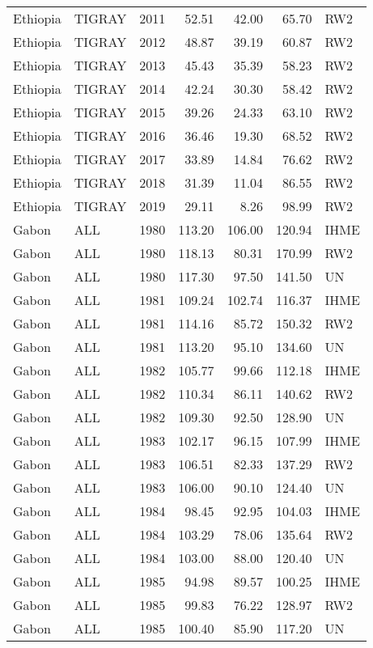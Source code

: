 \begin{longtable}{lllrrrl}
  Ethiopia & TIGRAY & 2011 & 52.51 & 42.00 & 65.70 & RW2 \\ 
  Ethiopia & TIGRAY & 2012 & 48.87 & 39.19 & 60.87 & RW2 \\ 
  Ethiopia & TIGRAY & 2013 & 45.43 & 35.39 & 58.23 & RW2 \\ 
  Ethiopia & TIGRAY & 2014 & 42.24 & 30.30 & 58.42 & RW2 \\ 
  Ethiopia & TIGRAY & 2015 & 39.26 & 24.33 & 63.10 & RW2 \\ 
  Ethiopia & TIGRAY & 2016 & 36.46 & 19.30 & 68.52 & RW2 \\ 
  Ethiopia & TIGRAY & 2017 & 33.89 & 14.84 & 76.62 & RW2 \\ 
  Ethiopia & TIGRAY & 2018 & 31.39 & 11.04 & 86.55 & RW2 \\ 
  Ethiopia & TIGRAY & 2019 & 29.11 & 8.26 & 98.99 & RW2 \\ 
  Gabon & ALL & 1980 & 113.20 & 106.00 & 120.94 & IHME \\ 
  Gabon & ALL & 1980 & 118.13 & 80.31 & 170.99 & RW2 \\ 
  Gabon & ALL & 1980 & 117.30 & 97.50 & 141.50 & UN \\ 
  Gabon & ALL & 1981 & 109.24 & 102.74 & 116.37 & IHME \\ 
  Gabon & ALL & 1981 & 114.16 & 85.72 & 150.32 & RW2 \\ 
  Gabon & ALL & 1981 & 113.20 & 95.10 & 134.60 & UN \\ 
  Gabon & ALL & 1982 & 105.77 & 99.66 & 112.18 & IHME \\ 
  Gabon & ALL & 1982 & 110.34 & 86.11 & 140.62 & RW2 \\ 
  Gabon & ALL & 1982 & 109.30 & 92.50 & 128.90 & UN \\ 
  Gabon & ALL & 1983 & 102.17 & 96.15 & 107.99 & IHME \\ 
  Gabon & ALL & 1983 & 106.51 & 82.33 & 137.29 & RW2 \\ 
  Gabon & ALL & 1983 & 106.00 & 90.10 & 124.40 & UN \\ 
  Gabon & ALL & 1984 & 98.45 & 92.95 & 104.03 & IHME \\ 
  Gabon & ALL & 1984 & 103.29 & 78.06 & 135.64 & RW2 \\ 
  Gabon & ALL & 1984 & 103.00 & 88.00 & 120.40 & UN \\ 
  Gabon & ALL & 1985 & 94.98 & 89.57 & 100.25 & IHME \\ 
  Gabon & ALL & 1985 & 99.83 & 76.22 & 128.97 & RW2 \\ 
  Gabon & ALL & 1985 & 100.40 & 85.90 & 117.20 & UN \\ 

\end{longtable}
